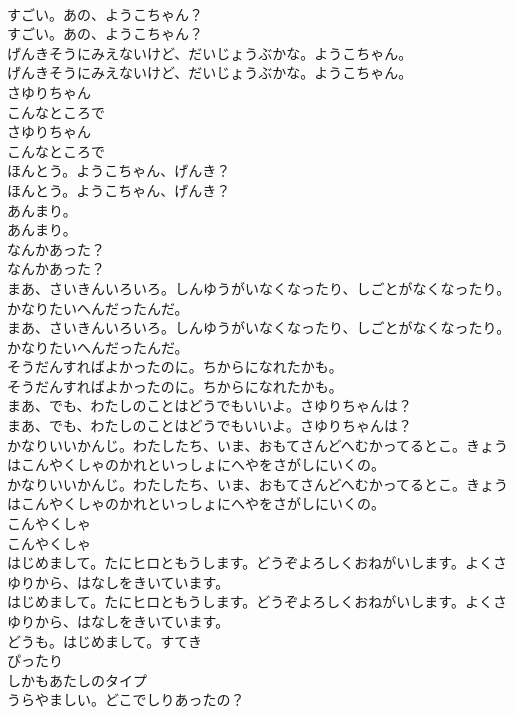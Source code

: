 \documentclass[8pt]{extreport}
\begin{document}
\begin{CJK}{UTF8}{min}
\\	すごい。あの、ようこちゃん？
\\	すごい。あの、ようこちゃん？
\\	げんきそうにみえないけど、だいじょうぶかな。ようこちゃん。
\\	げんきそうにみえないけど、だいじょうぶかな。ようこちゃん。
\\	さゆりちゃん
\\	こんなところで
\\	さゆりちゃん
\\	こんなところで
\\	ほんとう。ようこちゃん、げんき？
\\	ほんとう。ようこちゃん、げんき？
\\	あんまり。
\\	あんまり。
\\	なんかあった？
\\	なんかあった？
\\	まあ、さいきんいろいろ。しんゆうがいなくなったり、しごとがなくなったり。かなりたいへんだったんだ。
\\	まあ、さいきんいろいろ。しんゆうがいなくなったり、しごとがなくなったり。かなりたいへんだったんだ。
\\	そうだんすればよかったのに。ちからになれたかも。
\\	そうだんすればよかったのに。ちからになれたかも。
\\	まあ、でも、わたしのことはどうでもいいよ。さゆりちゃんは？
\\	まあ、でも、わたしのことはどうでもいいよ。さゆりちゃんは？
\\	かなりいいかんじ。わたしたち、いま、おもてさんどへむかってるとこ。きょうはこんやくしゃのかれといっしょにへやをさがしにいくの。
\\	かなりいいかんじ。わたしたち、いま、おもてさんどへむかってるとこ。きょうはこんやくしゃのかれといっしょにへやをさがしにいくの。
\\	こんやくしゃ
\\	こんやくしゃ
\\	はじめまして。たにヒロともうします。どうぞよろしくおねがいします。よくさゆりから、はなしをきいています。
\\	はじめまして。たにヒロともうします。どうぞよろしくおねがいします。よくさゆりから、はなしをきいています。
\\	どうも。はじめまして。すてき
\\	ぴったり
\\	しかもあたしのタイプ
\\	うらやましい。どこでしりあったの？

\end{CJK}
\end{document}
